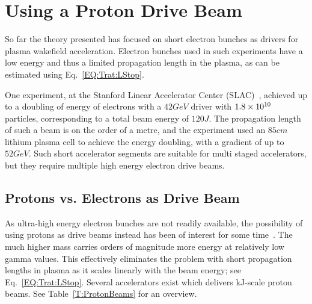 \section{Using a Proton Drive Beam}
\label{Int:DBeam}

So far the theory presented has focused on short electron bunches as drivers for plasma wakefield acceleration. Electron bunches used in such experiments have a low energy and thus a limited propagation length in the plasma, as can be estimated using Eq.~\ref{EQ:Trat:LStop}.

One experiment, at the Stanford Linear Accelerator Center (SLAC)~\cite{blumenfeld:2007}, achieved up to a doubling of energy of electrons with a $42\unit{GeV}$ driver with $1.8\times 10^{10}$ particles, corresponding to a total beam energy of $120\unit{J}$. The propagation length of such a beam is on the order of a metre, and the experiment used an $85\unit{cm}$ lithium plasma cell to achieve the energy doubling, with a gradient of up to $52\unit{GeV}$. Such short accelerator segments are suitable for multi staged accelerators, but they require multiple high energy electron drive beams. 

\subsection{Protons vs. Electrons as Drive Beam}
\label{Int:DBeam:PDPWFA}

As ultra-high energy electron bunches are not readily available, the possibility of using protons as drive beams instead has been of interest for some time~\cite{blue:2003,caldwell:2009}. The much higher mass carries orders of magnitude more energy at relatively low gamma values. This effectively eliminates the problem with short propagation lengths in plasma as it scales linearly with the beam energy; see Eq.~\ref{EQ:Trat:LStop}. Several accelerators exist which delivers kJ-scale proton beams. See Table~\ref{T:ProtonBeams} for an overview.

